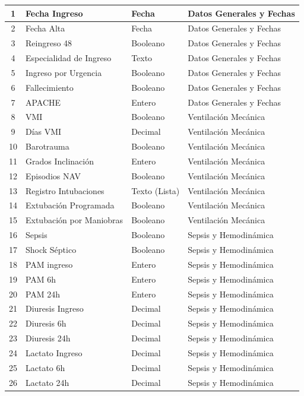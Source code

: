 \begin{longtable}{|c|l|l|l|}
1 & Fecha Ingreso & Fecha & Datos Generales y Fechas \\ \hline
2 & Fecha Alta & Fecha & Datos Generales y Fechas \\ \hline
3 & Reingreso 48 & Booleano & Datos Generales y Fechas \\ \hline
4 & Especialidad de Ingreso & Texto & Datos Generales y Fechas \\ \hline
5 & Ingreso por Urgencia & Booleano & Datos Generales y Fechas \\ \hline
6 & Fallecimiento & Booleano & Datos Generales y Fechas \\ \hline
7 & APACHE & Entero & Datos Generales y Fechas \\ \hline
8 & VMI & Booleano & Ventilación Mecánica \\ \hline
9 & Días VMI & Decimal & Ventilación Mecánica \\ \hline
10 & Barotrauma & Booleano & Ventilación Mecánica \\ \hline
11 & Grados Inclinación & Entero & Ventilación Mecánica \\ \hline
12 & Episodios NAV & Booleano & Ventilación Mecánica \\ \hline
13 & Registro Intubaciones & Texto (Lista) & Ventilación Mecánica \\ \hline
14 & Extubación Programada & Booleano & Ventilación Mecánica \\ \hline
15 & Extubación por Maniobras & Booleano & Ventilación Mecánica \\ \hline
16 & Sepsis & Booleano & Sepsis y Hemodinámica \\ \hline
17 & Shock Séptico & Booleano & Sepsis y Hemodinámica \\ \hline
18 & PAM ingreso & Entero & Sepsis y Hemodinámica \\ \hline
19 & PAM 6h & Entero & Sepsis y Hemodinámica \\ \hline
20 & PAM 24h & Entero & Sepsis y Hemodinámica \\ \hline
21 & Diuresis Ingreso & Decimal & Sepsis y Hemodinámica \\ \hline
22 & Diuresis 6h & Decimal & Sepsis y Hemodinámica \\ \hline
23 & Diuresis 24h & Decimal & Sepsis y Hemodinámica \\ \hline
24 & Lactato Ingreso & Decimal & Sepsis y Hemodinámica \\ \hline
25 & Lactato 6h & Decimal & Sepsis y Hemodinámica \\ \hline
26 & Lactato 24h & Decimal & Sepsis y Hemodinámica \\ \hline

\end{longtable}
